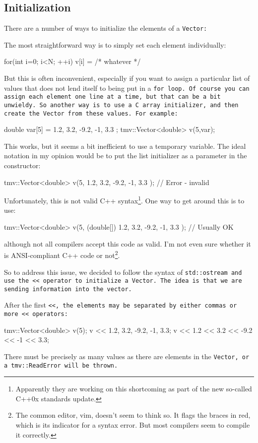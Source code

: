 \subsection{Initialization}
\label{Vector_Initialization}

There are a number of ways to initialize the elements of a \tt{Vector}:

The most straightforward way is to simply set each element individually:
\begin{tmvcode}
for(int i=0; i<N; ++i) {
    v[i] = /* whatever */
}
\end{tmvcode}

But this is often inconvenient, especially if you want to assign a particular list of 
values that does not lend itself to being put in a \tt{for} loop.  Of course you can assign
each element one line at a time, but that can be a bit unwieldy.  So another 
way is to use a C array initializer, and then create the \tt{Vector} from these values.  For example:
\begin{tmvcode}
double var[5] = { 1.2, 3.2, -9.2, -1, 3.3 };
tmv::Vector<double> v(5,var);
\end{tmvcode}
This works, but it seems a bit inefficient to use a temporary variable.  The ideal notation
in my opinion would be to put the list initializer as a parameter in the constructor:
\begin{tmvcode}
tmv::Vector<double> v(5, 
    { 1.2, 3.2, -9.2, -1, 3.3 }); // Error - invalid
\end{tmvcode}
Unfortunately, this is not valid C++ syntax\footnote{
Apparently they are working on this shortcoming as part of the new so-called C++0x 
standards update.}.
One way to get around this is to use:
\begin{tmvcode}
tmv::Vector<double> v(5, 
    (double[]) { 1.2, 3.2, -9.2, -1, 3.3 }); // Usually OK
\end{tmvcode}
although not all compilers accept this code as valid.  I'm not even sure whether
it is ANSI-compliant C++ code or not\footnote{
The common editor, vim, doesn't seem to think so.  
It flags the braces in red, which is its indicator for a syntax error.  But most compilers
seem to compile it correctly.}.

So to address this issue, we decided to follow the syntax of \tt{std::ostream}
and use the \tt{<<} operator to initialize a \tt{Vector}.  The idea is that we are 
sending information into the vector.  

After the first 
\tt{<<}, the elements may be separated by either commas or more \tt{<<}
operators:
\begin{tmvcode}
tmv::Vector<double> v(5);
v << 1.2, 3.2, -9.2, -1, 3.3;
v << 1.2 << 3.2 << -9.2 << -1 << 3.3;
\end{tmvcode}
There must be precisely as many values as there are elements in the \tt{Vector},
or a \tt{tmv::ReadError} will be thrown.

